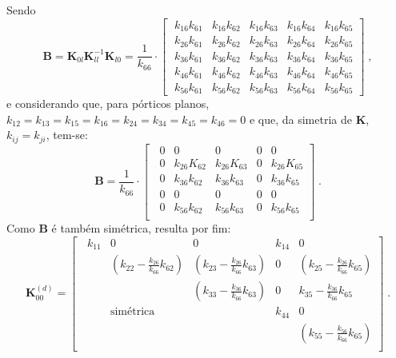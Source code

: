 \noindent Sendo
\begin{equation} \mathbf{B}= \mathbf{K}_{0l}\mathbf{K}_{ll}^{-1}\mathbf{K}_{l0}=\frac{1}{k_{66}}\!\cdot\!
	\left[ \; \begin{array}{ccccc}
			k_{16}k_{61} & k_{16}k_{62} & k_{16}k_{63} & k_{16}k_{64} & k_{16}k_{65} \\
			k_{26}k_{61} & k_{26}k_{62} & k_{26}k_{63} & k_{26}k_{64} & k_{26}k_{65} \\
			k_{36}k_{61} & k_{36}k_{62} & k_{36}k_{63} & k_{36}k_{64} & k_{36}k_{65} \\
			k_{46}k_{61} & k_{46}k_{62} & k_{46}k_{63} & k_{46}k_{64} & k_{46}k_{65} \\
			k_{56}k_{61} & k_{56}k_{62} & k_{56}k_{63} & k_{56}k_{64} & k_{56}k_{65}
		\end{array} \right] \; ,\end{equation}
\noindent e considerando que, para pórticos planos, \(k_{12}=k_{13}=k_{15}=k_{16}=k_{24}=k_{34}=k_{45}=k_{46}=0\) e que, da simetria de \(\mathbf{K}\), \(k_{ij}=k_{ji}\), tem-se:
\[ \mathbf{B}=\frac{1}{k_{66}}\!\cdot\!
	\left[ \;\; \begin{matrix}
			0 & 0            & 0            & 0 & 0            \\
			0 & k_{26}K_{62} & k_{26}K_{63} & 0 & k_{26}K_{65} \\
			0 & k_{36}k_{62} & k_{36}k_{63} & 0 & k_{36}k_{65} \\
			0 & 0            & 0            & 0 & 0            \\
			0 & k_{56}k_{62} & k_{56}k_{63} & 0 & k_{56}k_{65} \\
		\end{matrix} \right] \; .\]
\noindent Como \(\mathbf{B}\) é também simétrica, resulta por fim:\[\mathbf{K}_{00}^{(d)}=
	\left[\;\; \begin{matrix}
			k_{11} & 0                                                & 0                                                  & k_{14} & 0                                                 \\
			       & \left(k_{22} -\frac{k_{26}}{k_{66}}k_{62}\right) & \left(k_{23} -\frac{k_{26}}{k_{66}}k_{63}\right)   & 0      & \left(k_{25} -\frac{k_{26}}{k_{66}}k_{65} \right) \\
			       &                                                  & \left( k_{33} -\frac{k_{36}}{k_{66}}k_{63} \right) & 0      & k_{35} -\frac{k_{36}}{k_{66}}k_{65}               \\
			       & \textrm{simétrica}                               &                                                    & k_{44} & 0                                                 \\
			       &                                                  &                                                    &        & \left(k_{55} -\frac{k_{56}}{k_{66}}k_{65} \right) \\
		\end{matrix} \right] \; .\]

